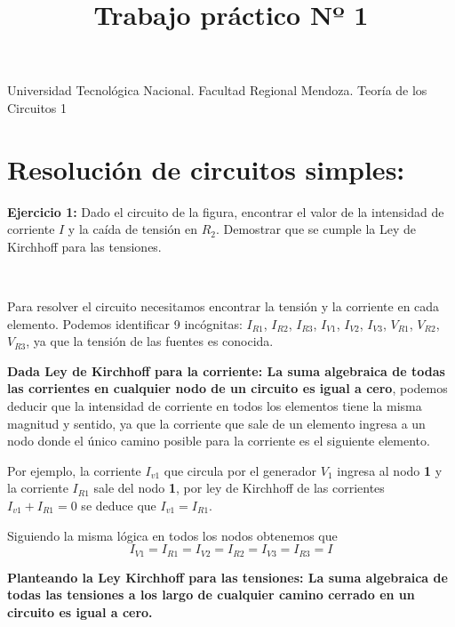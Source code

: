 \documentclass[11pt]{article}
\title{Trabajo práctico Nº 1}
\begin{document}
    
    \maketitle
    
    

    
    Universidad Tecnológica Nacional. Facultad Regional Mendoza. Teoría de
los Circuitos 1

\hypertarget{resoluciuxf3n-de-circuitos-simples}{%
\section{Resolución de circuitos
simples:}\label{resoluciuxf3n-de-circuitos-simples}}

    \textbf{Ejercicio 1:} Dado el circuito de la figura, encontrar el valor
de la intensidad de corriente \(I\) y la caída de tensión en \(R_2\).
Demostrar que se cumple la Ley de Kirchhoff para las tensiones.

    \begin{center}
    \end{center}
    { \hspace*{\fill} \\}
    
    Para resolver el circuito necesitamos encontrar la tensión y la
corriente en cada elemento. Podemos identificar 9 incógnitas:
\(I_{R1}\), \(I_{R2}\), \(I_{R3}\), \(I_{V1}\), \(I_{V2}\), \(I_{V3}\),
\(V_{R1}\), \(V_{R2}\), \(V_{R3}\), ya que la tensión de las fuentes es
conocida.

\textbf{Dada Ley de Kirchhoff para la corriente: La suma algebraica de
todas las corrientes en cualquier nodo de un circuito es igual a cero},
podemos deducir que la intensidad de corriente en todos los elementos
tiene la misma magnitud y sentido, ya que la corriente que sale de un
elemento ingresa a un nodo donde el único camino posible para la
corriente es el siguiente elemento.

Por ejemplo, la corriente \(I_{v1}\) que circula por el generador
\(V_1\) ingresa al nodo \textbf{1} y la corriente \(I_{R1}\) sale del
nodo \textbf{1}, por ley de Kirchhoff de las corrientes
\(I_{v1}+I_{R1}=0\) se deduce que \(I_{v1}=I_{R1}\).

Siguiendo la misma lógica en todos los nodos obtenemos que
\[I_{V1}=I_{R1}=I_{V2}=I_{R2}=I_{V3}=I_{R3}=I\]

\textbf{Planteando la Ley Kirchhoff para las tensiones: La suma
algebraica de todas las tensiones a los largo de cualquier camino
cerrado en un circuito es igual a cero.}
\end{document}
